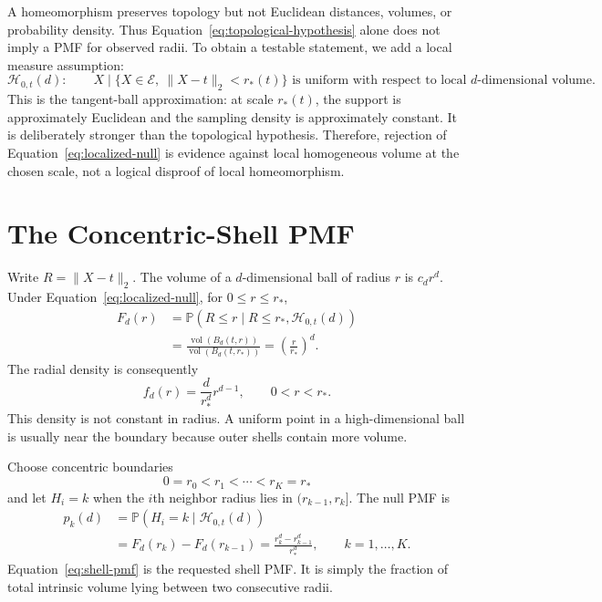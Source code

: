\documentclass[11pt]{article}
\newcommand{\Prb}{\mathbb{P}}
\newcommand{\Ball}{B}
\newcommand{\vol}{\operatorname{vol}}
\begin{document}
A homeomorphism preserves topology but not Euclidean distances, volumes, or
probability density. Thus Equation~\eqref{eq:topological-hypothesis} alone does
not imply a PMF for observed radii. To obtain a testable statement, we add a
local measure assumption:
\begin{equation}
  \mathcal H_{0,t}(d):\qquad
  X\mid\{X\in\mathcal E,\ \|X-t\|_2<r_\ast(t)\}
  \text{ is uniform with respect to local $d$-dimensional volume.}
  \label{eq:localized-null}
\end{equation}
This is the tangent-ball approximation: at scale $r_\ast(t)$, the support is
approximately Euclidean and the sampling density is approximately constant.
It is deliberately stronger than the topological hypothesis. Therefore,
rejection of Equation~\eqref{eq:localized-null} is evidence against local
homogeneous volume at the chosen scale, not a logical disproof of local
homeomorphism.

\section{The Concentric-Shell PMF}

Write $R=\|X-t\|_2$. The volume of a $d$-dimensional ball of radius $r$ is
$c_d r^d$. Under Equation~\eqref{eq:localized-null}, for $0\le r\le r_\ast$,
\begin{align}
  F_d(r)
  &=\Prb(R\le r\mid R\le r_\ast,\mathcal H_{0,t}(d)) \\
  &=\frac{\vol(\Ball_d(t,r))}{\vol(\Ball_d(t,r_\ast))}
    =\left(\frac{r}{r_\ast}\right)^d.
  \label{eq:radial-cdf}
\end{align}
The radial density is consequently
\begin{equation}
  f_d(r)=\frac{d}{r_\ast^d}r^{d-1},\qquad 0<r<r_\ast.
  \label{eq:radial-density}
\end{equation}
This density is not constant in radius. A uniform point in a high-dimensional
ball is usually near the boundary because outer shells contain more volume.

Choose concentric boundaries
\[
  0=r_0<r_1<\cdots<r_K=r_\ast
\]
and let $H_i=k$ when the $i$th neighbor radius lies in
$(r_{k-1},r_k]$. The null PMF is
\begin{align}
  p_k(d)
  &=\Prb(H_i=k\mid\mathcal H_{0,t}(d)) \\
  &=F_d(r_k)-F_d(r_{k-1})
    =\frac{r_k^d-r_{k-1}^d}{r_\ast^d},
  \qquad k=1,\ldots,K.
  \label{eq:shell-pmf}
\end{align}
Equation~\eqref{eq:shell-pmf} is the requested shell PMF. It is simply the
fraction of total intrinsic volume lying between two consecutive radii.
\end{document}
